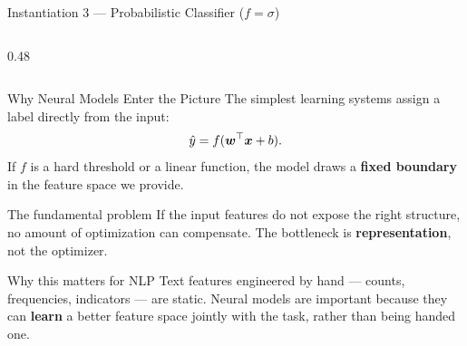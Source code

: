 \documentclass[11pt,aspectratio=169,professionalfonts]{beamer}
\begin{document}
\begin{frame}{Instantiation 3 — Probabilistic Classifier ($f = \sigma$)}
\begin{columns}[T]
\begin{column}{0.48\textwidth}
\end{column}
\end{columns}

\end{frame}
%
%
\begin{frame}{Why Neural Models Enter the Picture}
The simplest learning systems assign a label directly from the input:
\[
\hat{y} = f(\bm{w}^{\top}\bm{x} + b).
\]
If $f$ is a hard threshold or a linear function, the model draws a \textbf{fixed boundary} in the feature space we provide.

\vspace{0.2cm}
\begin{block}{The fundamental problem}
If the input features do not expose the right structure, no amount of optimization can compensate. The bottleneck is \textbf{representation}, not the optimizer.
\end{block}

\vspace{0.15cm}
\begin{alertblock}{Why this matters for NLP}
Text features engineered by hand --- counts, frequencies, indicators --- are static. Neural models are important because they can \textbf{learn} a better feature space jointly with the task, rather than being handed one.
\end{alertblock}
\end{frame}
%
%
\end{document}
